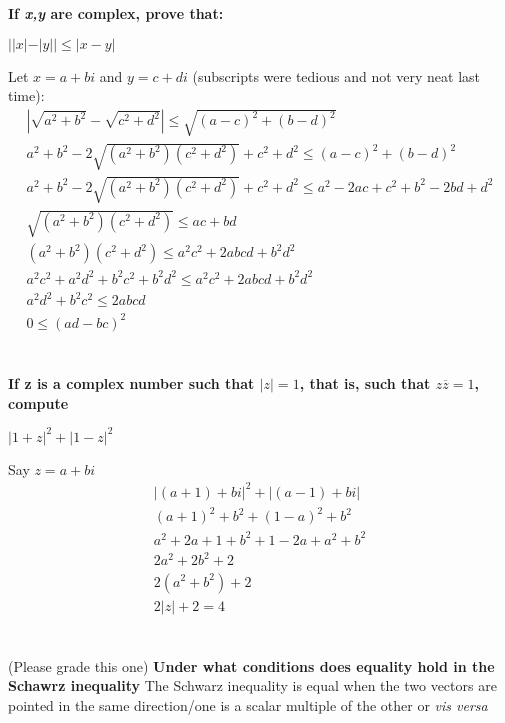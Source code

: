 \documentclass{article}
\begin{document}
\section{}
\noindent \textbf{If \emph{x,y} are complex, prove that:} \begin{center} $||x| - |y|| \le |x-y| $ \end{center}
Let $x = a + bi$ and $y = c + di$ (subscripts were tedious and not very neat last time):
\begin{align*}
|\sqrt{a^2 + b^2} - \sqrt{c^2 + d^2}| \le \sqrt{(a-c)^2 + (b - d)^2}\\
a^2 + b^2 -2\sqrt{(a^2+b^2)(c^2 + d^2)} + c^2 + d^2 \le (a-c)^2 + (b - d)^2\\
a^2 + b^2 -2\sqrt{(a^2+b^2)(c^2 + d^2)} + c^2 + d^2 \le a^2 - 2ac +c^2 + b^2 -2bd + d^2\\
\sqrt{(a^2+b^2)(c^2 + d^2)} \le ac + bd\\
(a^2+b^2)(c^2 + d^2) \le a^2c^2 + 2abcd + b^2d^2\\
a^2c^2 + a^2d^2 + b^2c^2 + b^2d^2 \le  a^2c^2 + 2abcd + b^2d^2\\
a^2d^2 +  b^2c^2 \le 2abcd\\
0 \le (ad - bc)^2
\end{align*}

\section{}
\noindent \textbf{If z is a complex number such that $|z| = 1$, that is, such that $z\overline{z} = 1$, compute} \begin{center}$|1+z|^2 + |1-z|^2$ \end{center} 
Say $z = a + bi$
\begin{align*}
|(a + 1) + bi|^2 + |(a-1) + bi|\\
(a+1)^2 + b^2 + (1-a)^2 + b^2\\
a^2 + 2a + 1 + b^2 + 1 - 2a + a^2 + b^2\\
2a^2 + 2b^2 + 2\\
2(a^2 + b^2) + 2\\
2|z| + 2 = 4
\end{align*}

\section{} (Please grade this one)
\noindent \textbf{Under what conditions does equality hold in the Schawrz inequality}
The Schwarz inequality is equal when the two vectors are pointed in the same direction/one is a scalar multiple of the other or \emph{vis versa}
\end{document}
